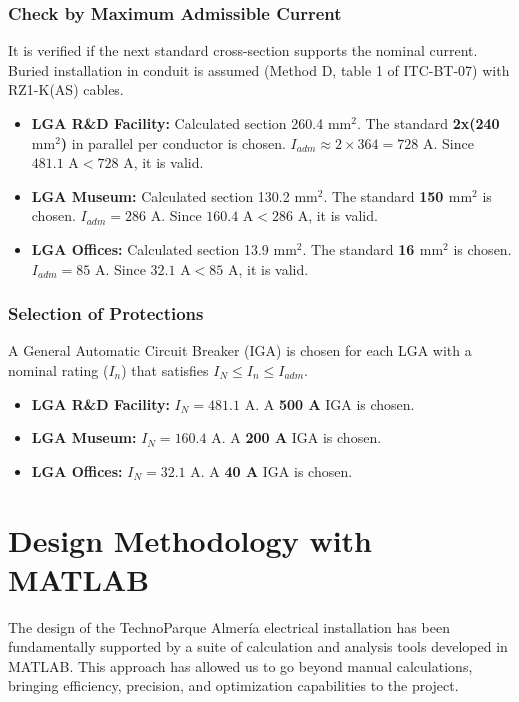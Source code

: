 \documentclass[12pt, a4paper]{report}
\begin{document}
\subsection{Check by Maximum Admissible Current}
It is verified if the next standard cross-section supports the nominal current. Buried installation in conduit is assumed (Method D, table 1 of ITC-BT-07) with RZ1-K(AS) cables.
\begin{itemize}
    \item \textbf{LGA R\&D Facility:} Calculated section 260.4 $\text{mm}^2$. The standard \textbf{2x(240 $\text{mm}^2$)} in parallel per conductor is chosen. $I_{adm} \approx 2 \times 364 = 728$ A. Since $481.1 \text{ A} < 728 \text{ A}$, it is valid.
    \item \textbf{LGA Museum:} Calculated section 130.2 $\text{mm}^2$. The standard \textbf{150 $\text{mm}^2$} is chosen. $I_{adm} = 286$ A. Since $160.4 \text{ A} < 286 \text{ A}$, it is valid.
    \item \textbf{LGA Offices:} Calculated section 13.9 $\text{mm}^2$. The standard \textbf{16 $\text{mm}^2$} is chosen. $I_{adm} = 85$ A. Since $32.1 \text{ A} < 85 \text{ A}$, it is valid.
\end{itemize}

\subsection{Selection of Protections}
A General Automatic Circuit Breaker (IGA) is chosen for each LGA with a nominal rating ($I_n$) that satisfies $I_N \le I_n \le I_{adm}$.
\begin{itemize}
    \item \textbf{LGA R\&D Facility:} $I_N=481.1$ A. A \textbf{500 A} IGA is chosen.
    \item \textbf{LGA Museum:} $I_N=160.4$ A. A \textbf{200 A} IGA is chosen.
    \item \textbf{LGA Offices:} $I_N=32.1$ A. A \textbf{40 A} IGA is chosen.
\end{itemize}


\chapter{Design Methodology with MATLAB}
\label{chap:matlab}
The design of the TechnoParque Almería electrical installation has been fundamentally supported by a suite of calculation and analysis tools developed in MATLAB. This approach has allowed us to go beyond manual calculations, bringing efficiency, precision, and optimization capabilities to the project.
\end{document}
